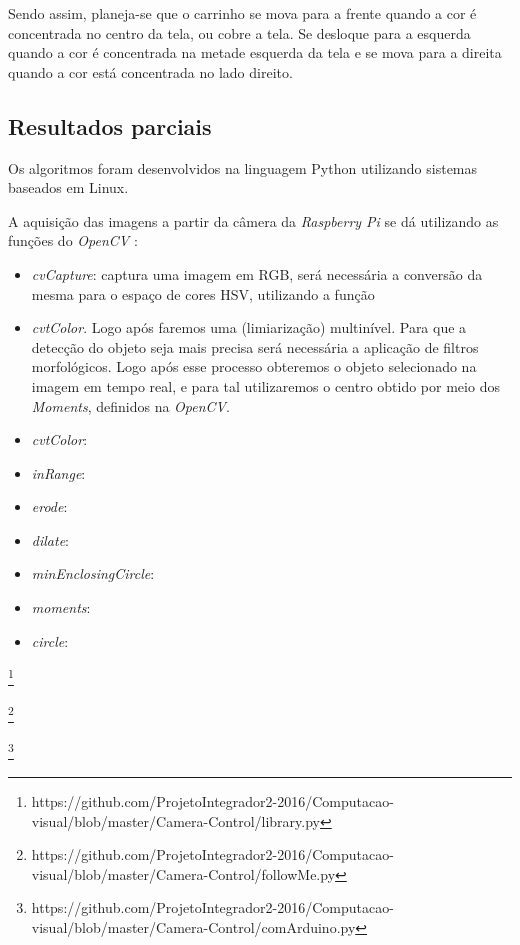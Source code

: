 Sendo assim, planeja-se que o carrinho se mova para a frente quando a cor é concentrada no centro da tela, ou cobre a tela. Se desloque para a esquerda quando a cor é concentrada na metade esquerda da tela e se mova para a direita quando a cor está concentrada no lado direito. 

\subsection{Resultados parciais}

Os algoritmos foram desenvolvidos na linguagem Python utilizando sistemas baseados em Linux. 
	
A aquisição das imagens a partir da câmera da \textit{Raspberry Pi} se dá utilizando as funções do \textit{OpenCV} :

\begin{itemize} 
    \item \textit{cvCapture}: captura uma imagem em RGB, será necessária a conversão da mesma para o espaço de cores HSV, utilizando a função
    \item \textit{cvtColor}. Logo após faremos uma (limiarização) multinível. Para que a detecção do objeto seja mais precisa será necessária a aplicação de filtros morfológicos. Logo após esse processo obteremos o objeto selecionado na imagem em tempo real, e para tal utilizaremos o centro obtido por meio dos \textit{Moments}, definidos na \textit{OpenCV}.
    \item \textit{cvtColor}:
    \item \textit{inRange}:
    \item \textit{erode}:
    \item \textit{dilate}:
    \item \textit{minEnclosingCircle}:
    \item \textit{moments}:
    \item \textit{circle}:
\end{itemize}
 

\footnote{https://github.com/ProjetoIntegrador2-2016/Computacao-visual/blob/master/Camera-Control/library.py}
 

\footnote{https://github.com/ProjetoIntegrador2-2016/Computacao-visual/blob/master/Camera-Control/followMe.py}

\footnote{https://github.com/ProjetoIntegrador2-2016/Computacao-visual/blob/master/Camera-Control/comArduino.py}




